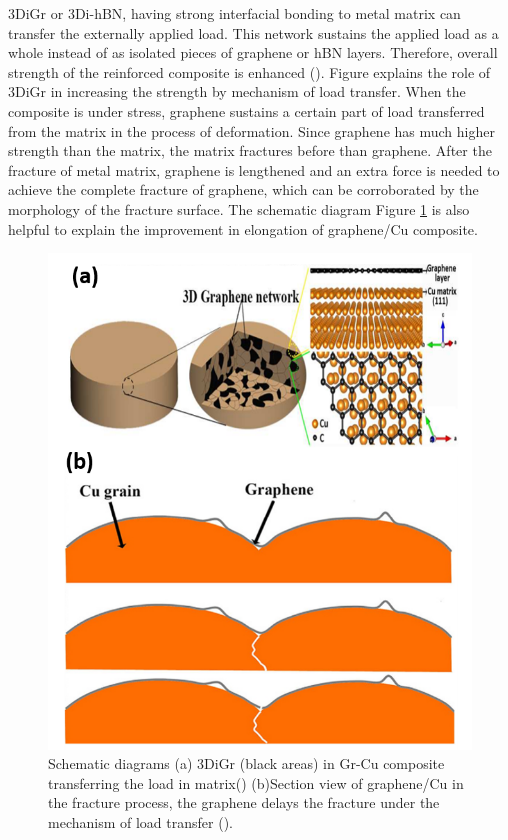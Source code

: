3DiGr or 3Di-hBN, having strong interfacial bonding to metal matrix can transfer the externally applied load. This network sustains the applied load as a whole instead of as isolated pieces of graphene or hBN layers. Therefore, overall strength of the reinforced composite is enhanced (\cite{chen2016fabrication}). Figure explains the role of 3DiGr in increasing the strength by mechanism of load transfer. When the composite is under stress, graphene sustains a certain part of load transferred from the matrix in the process of deformation. Since graphene has much higher strength than the matrix, the matrix fractures before than graphene. After the fracture of metal matrix, graphene is lengthened and an extra force is needed to achieve the complete fracture of graphene, which can be corroborated by the morphology of the fracture surface. The schematic diagram Figure \ref{fig:load_transfer} is also helpful to explain the improvement in elongation of graphene/Cu composite. 


\begin{figure}[!htb]
\centering
\includegraphics[scale=0.35]{graphics/chapter_1/load_transfer}
\caption{Schematic diagrams (a) 3DiGr (black areas) in Gr-Cu composite transferring the load in matrix(\cite{chu2018interface}) (b)Section view of graphene/Cu in the fracture process, the graphene delays the fracture under the mechanism of load transfer (\cite{chen2016fabrication}).}
\label{fig:load_transfer}
\end{figure}

